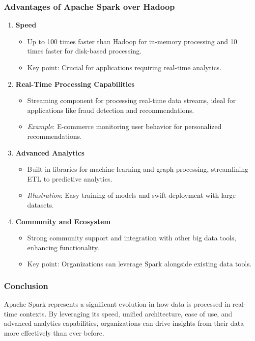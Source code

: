 \documentclass[aspectratio=169]{beamer}
\begin{document}
\begin{frame}[fragile]
    \frametitle{Advantages of Apache Spark over Hadoop}
    \begin{enumerate}
        \item \textbf{Speed}
            \begin{itemize}
                \item Up to 100 times faster than Hadoop for in-memory processing and 10 times faster for disk-based processing.
                \item Key point: Crucial for applications requiring real-time analytics.
            \end{itemize}
        
        \item \textbf{Real-Time Processing Capabilities}
            \begin{itemize}
                \item Streaming component for processing real-time data streams, ideal for applications like fraud detection and recommendations.
                \item \textit{Example}: E-commerce monitoring user behavior for personalized recommendations.
            \end{itemize}
        
        \item \textbf{Advanced Analytics}
            \begin{itemize}
                \item Built-in libraries for machine learning and graph processing, streamlining ETL to predictive analytics.
                \item \textit{Illustration}: Easy training of models and swift deployment with large datasets.
            \end{itemize}
        
        \item \textbf{Community and Ecosystem}
            \begin{itemize}
                \item Strong community support and integration with other big data tools, enhancing functionality.
                \item Key point: Organizations can leverage Spark alongside existing data tools.
            \end{itemize}
    \end{enumerate}
\end{frame}

\begin{frame}[fragile]
    \frametitle{Conclusion}
    Apache Spark represents a significant evolution in how data is processed in real-time contexts. By leveraging its speed, unified architecture, ease of use, and advanced analytics capabilities, organizations can drive insights from their data more effectively than ever before.
\end{frame}
\end{document}
